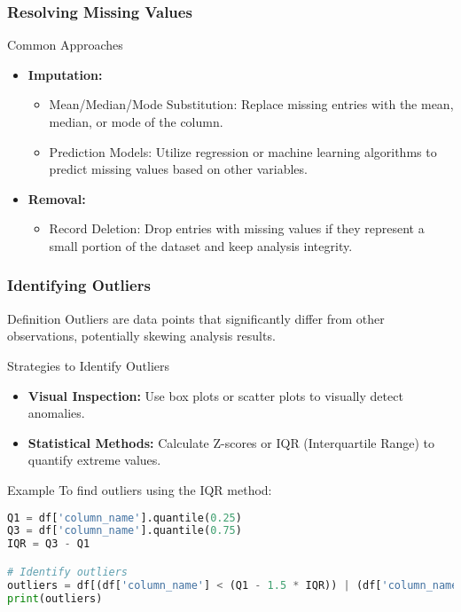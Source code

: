 \documentclass{beamer}
\begin{document}
\begin{frame}
    \frametitle{Resolving Missing Values}
    \begin{block}{Common Approaches}
        \begin{itemize}
            \item \textbf{Imputation:}
            \begin{itemize}
                \item Mean/Median/Mode Substitution: Replace missing entries with the mean, median, or mode of the column.
                \item Prediction Models: Utilize regression or machine learning algorithms to predict missing values based on other variables.
            \end{itemize}

            \item \textbf{Removal:}
            \begin{itemize}
                \item Record Deletion: Drop entries with missing values if they represent a small portion of the dataset and keep analysis integrity.
            \end{itemize}
        \end{itemize}
    \end{block}
\end{frame}

\begin{frame}[fragile]
    \frametitle{Identifying Outliers}
    \begin{block}{Definition}
        Outliers are data points that significantly differ from other observations, potentially skewing analysis results.
    \end{block}

    \begin{block}{Strategies to Identify Outliers}
        \begin{itemize}
            \item \textbf{Visual Inspection:} Use box plots or scatter plots to visually detect anomalies.
            \item \textbf{Statistical Methods:} Calculate Z-scores or IQR (Interquartile Range) to quantify extreme values.
        \end{itemize}
    \end{block}

    \begin{block}{Example}
        To find outliers using the IQR method:
        \begin{lstlisting}[language=Python]
Q1 = df['column_name'].quantile(0.25)
Q3 = df['column_name'].quantile(0.75)
IQR = Q3 - Q1

# Identify outliers
outliers = df[(df['column_name'] < (Q1 - 1.5 * IQR)) | (df['column_name'] > (Q3 + 1.5 * IQR))]
print(outliers)
        \end{lstlisting}
    \end{block}
\end{frame}
\end{document}
